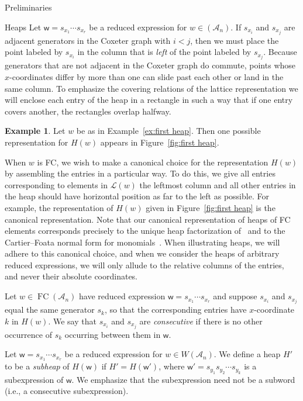 \documentclass[11pt]{amsart}
\theoremstyle{definition}
\newtheorem{example}[theorem]{Example}
\numberwithin{equation}{section}
\newcommand{\A}{\mathcal{A}}
\renewcommand{\L}{\mathcal{L}}
\renewcommand{\(}{\left(}
\renewcommand{\)}{\right)}
\newcommand{\w}{\mathsf{w}}
\DeclareMathOperator{\FC}{FC}
\begin{document}
\begin{section}{Preliminaries}
\begin{subsection}{Heaps}
Let $\w=s_{x_1}\cdots s_{x_r}$ be a reduced expression for $w \in (\A_{n})$.  If $s_{x_i}$ and $s_{x_j}$ are adjacent generators in the Coxeter graph with $i<j$, then we must place the point labeled by $s_{x_i}$ in the column that is \emph{left} of the point labeled by $s_{x_j}$.  Because generators that are not adjacent in the Coxeter graph do commute, points whose $x$-coordinates differ by more than one can slide past each other or land in the same column.  To emphasize the covering relations of the lattice representation we will enclose each entry of the heap in a rectangle in such a way that if one entry covers another, the rectangles overlap halfway.

\begin{example}\label{ex:second heap}
Let $w$ be as in Example~\ref{ex:first heap}.  Then one possible representation for $H(w)$ appears in Figure~\ref{fig:first heap}.
\end{example}

When $w$ is FC, we wish to make a canonical choice for the representation $H(w)$ by assembling the entries in a particular way.  To do this, we give all entries corresponding to elements in $\L(w)$ the leftmost column and all other entries in the heap should have horizontal position as far to the left as possible.  For example, the representation of $H(w)$ given in Figure~\ref{fig:first heap} is the canonical representation.  Note that our canonical representation of heaps of FC elements corresponds precisely to the unique heap factorization of~\cite[Lemma 2.9]{Viennot1986} and to the Cartier--Foata normal form for monomials~\cite{Cartier1969,Green2006a}.  When illustrating heaps, we will adhere to this canonical choice, and when we consider the heaps of arbitrary reduced expressions, we will only allude to the relative columns of the entries, and never their absolute coordinates.  

Let $w \in \FC(\A_n)$ have reduced expression $\w=s_{x_1}\cdots s_{x_r}$ and suppose $s_{x_i}$ and $s_{x_j}$ equal the same generator $s_k$, so that the corresponding entries have $x$-coordinate $k$ in $H(w)$.  We say that $s_{x_i}$ and $s_{x_j}$ are \emph{consecutive} if there is no other occurrence of $s_{k}$ occurring between them in $\w$.

Let $\w=s_{x_{1}} \cdots s_{x_{r}}$ be a reduced expression for $w \in W(\A_{n})$.  We define a heap $H'$ to be a \emph{subheap} of $H(\w)$ if $H'=H(\w')$, where $\w'=s_{y_1}s_{y_2} \cdots s_{y_k}$ is a subexpression of $\w$.  We emphasize that the subexpression need not be a subword (i.e., a consecutive subexpression).


\end{subsection}
\end{section}
\end{document}
